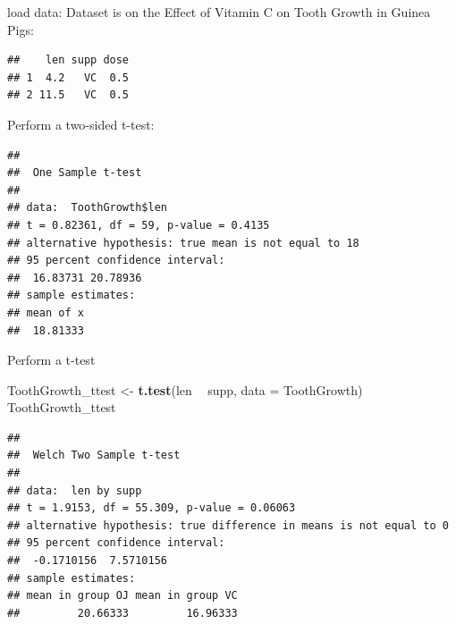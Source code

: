 \documentclass[]{book}
\newenvironment{Shaded}{\begin{snugshade}}{\end{snugshade}}
\newcommand{\DataTypeTok}[1]{\textcolor[rgb]{0.13,0.29,0.53}{#1}}
\newcommand{\DecValTok}[1]{\textcolor[rgb]{0.00,0.00,0.81}{#1}}
\newcommand{\KeywordTok}[1]{\textcolor[rgb]{0.13,0.29,0.53}{\textbf{#1}}}
\newcommand{\NormalTok}[1]{#1}
\newcommand{\OperatorTok}[1]{\textcolor[rgb]{0.81,0.36,0.00}{\textbf{#1}}}
\newcommand{\StringTok}[1]{\textcolor[rgb]{0.31,0.60,0.02}{#1}}
\begin{document}
load data: Dataset is on the Effect of Vitamin C on Tooth Growth in Guinea Pigs:

\begin{Shaded}
\end{Shaded}

\begin{verbatim}
##    len supp dose
## 1  4.2   VC  0.5
## 2 11.5   VC  0.5
\end{verbatim}

Perform a two-sided t-test:

\begin{Shaded}
\end{Shaded}

\begin{verbatim}
## 
## 	One Sample t-test
## 
## data:  ToothGrowth$len
## t = 0.82361, df = 59, p-value = 0.4135
## alternative hypothesis: true mean is not equal to 18
## 95 percent confidence interval:
##  16.83731 20.78936
## sample estimates:
## mean of x 
##  18.81333
\end{verbatim}

Perform a t-test

\begin{Shaded}
\begin{Highlighting}[]
\NormalTok{ToothGrowth_ttest <-}\StringTok{ }\KeywordTok{t.test}\NormalTok{(len }\OperatorTok{~}\StringTok{ }\NormalTok{supp, }\DataTypeTok{data =}\NormalTok{ ToothGrowth)}
\NormalTok{ToothGrowth_ttest}
\end{Highlighting}
\end{Shaded}

\begin{verbatim}
## 
## 	Welch Two Sample t-test
## 
## data:  len by supp
## t = 1.9153, df = 55.309, p-value = 0.06063
## alternative hypothesis: true difference in means is not equal to 0
## 95 percent confidence interval:
##  -0.1710156  7.5710156
## sample estimates:
## mean in group OJ mean in group VC 
##         20.66333         16.96333
\end{verbatim}
\end{document}
